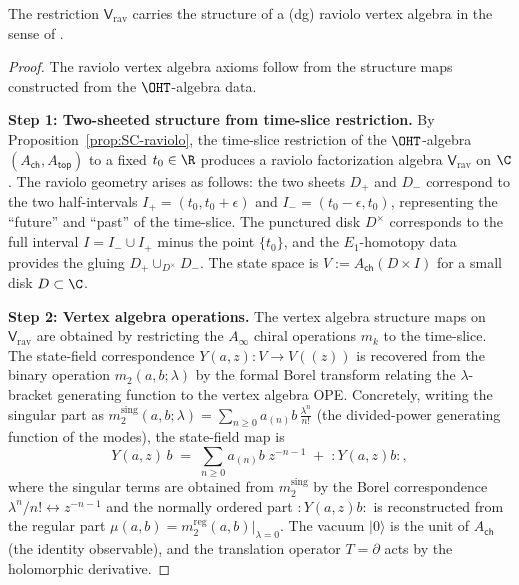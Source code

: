\begin{proposition}\label{prop:raviolo-VA}
The restriction $\mathsf V_{\mathrm{rav}}$ carries the structure of a (dg) raviolo vertex algebra in the sense of \cite{GW23,AKY24}.
\end{proposition}
\begin{proof}
The raviolo vertex algebra axioms follow from the structure maps constructed from the $\OHT$-algebra data.

\medskip\noindent\textbf{Step 1: Two-sheeted structure from time-slice restriction.}
By Proposition~\ref{prop:SC-raviolo}, the time-slice restriction of the $\OHT$-algebra $(A_{\mathsf{ch}}, A_{\mathsf{top}})$ to a fixed $t_0\in\R$ produces a raviolo factorization algebra $\mathsf{V}_{\mathrm{rav}}$ on $\C$. The raviolo geometry arises as follows: the two sheets $D_+$ and $D_-$ correspond to the two half-intervals $I_+ = (t_0, t_0+\epsilon)$ and $I_- = (t_0-\epsilon, t_0)$, representing the ``future'' and ``past'' of the time-slice. The punctured disk $D^\times$ corresponds to the full interval $I = I_-\cup I_+$ minus the point $\{t_0\}$, and the $E_1$-homotopy data provides the gluing $D_+\cup_{D^\times} D_-$. The state space is $V := A_{\mathsf{ch}}(D\times I)$ for a small disk $D\subset\C$.

\medskip\noindent\textbf{Step 2: Vertex algebra operations.}
The vertex algebra structure maps on $\mathsf{V}_{\mathrm{rav}}$ are obtained by restricting the $A_\infty$ chiral operations $m_k$ to the time-slice. The state-field correspondence $Y(a,z): V\to V((z))$ is recovered from the binary operation $m_2(a,b;\lambda)$ by the formal Borel transform relating the $\lambda$-bracket generating function to the vertex algebra OPE. Concretely, writing the singular part as $m_2^{\mathrm{sing}}(a,b;\lambda) = \sum_{n\ge 0} a_{(n)}b\,\frac{\lambda^n}{n!}$ (the divided-power generating function of the modes), the state-field map is
\[
 Y(a,z)\,b \;=\; \sum_{n\ge 0} a_{(n)}b\; z^{-n-1} \;+\; {:}\!Y(a,z)b\!{:},
\]
where the singular terms are obtained from $m_2^{\mathrm{sing}}$ by the Borel correspondence $\lambda^n/n! \leftrightarrow z^{-n-1}$ and the normally ordered part ${:}\!Y(a,z)b\!{:}$ is reconstructed from the regular part $\mu(a,b) = m_2^{\mathrm{reg}}(a,b)|_{\lambda=0}$. The vacuum $|0\rangle$ is the unit of $A_{\mathsf{ch}}$ (the identity observable), and the translation operator $T = \partial$ acts by the holomorphic derivative.


\end{proof}
